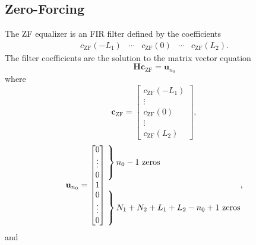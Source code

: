 \subsection{Zero-Forcing}
The ZF equalizer is an FIR filter defined by the coefficients
\begin{equation}
\begin{matrix}
c_\text{ZF}(-L_1) & \cdots & c_\text{ZF}(0) & \cdots & c_\text{ZF}(L_2).
\end{matrix}
\end{equation}
The filter coefficients are the solution to the matrix vector equation \cite[eq. (324)]{PAQ-phase1}
\begin{equation}
\mathbf{H} \mathbf{c}_\text{ZF} = \mathbf{u}_{n_0}
\label{eq:c_hayes}
\end{equation}
where
\begin{equation}
\mathbf{c}_\text{ZF} = 
\begin{bmatrix}
c_\text{ZF}(-L_1) \\ \vdots \\ c_\text{ZF}(0) \\ \vdots \\ c_\text{ZF}(L_2)
\end{bmatrix},
\end{equation}
\begin{equation}
\mathbf{u}_{n_0} = \begin{bmatrix} 0 \\ \vdots \\ 0 \\ 1 \\ 0 \\ \vdots \\ 0 \end{bmatrix}
	\begin{matrix*}[l] \left. \vphantom{\begin{matrix} 0 \\ \vdots \\ 0 \end{matrix}} \right\}
		\text{$n_0-1$ zeros}
		\\ \\
		\left. \vphantom{\begin{matrix} 0 \\ \vdots \\ 0 \end{matrix}} \right\}
		\text{$N_1+N_2+L_1+L_2-n_0+1$ zeros}
		\end{matrix*},
		\label{eq:un0_ZF}
\end{equation}
and
